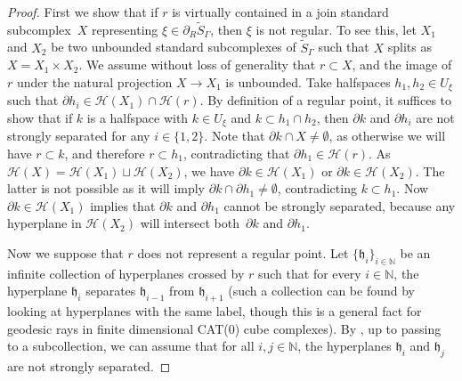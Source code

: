\documentclass[11pt]{article}
\numberwithin{equation}{section}
\let\mathcal\mathscr
\theoremstyle{plain}
\theoremstyle{definition}
\begin{document}
\begin{proof}
First we show that if $r$ is virtually contained in a join standard subcomplex~$X$ representing $\xi\in \partial_R \widetilde{S}_\Gamma$, then $\xi$ is not regular. To see this, let $X_1$ and $X_2$ be two unbounded standard subcomplexes of $\widetilde{S}_\Gamma$ such that $X$ splits as $X=X_1\times X_2$. We assume without loss of generality that $r\subset X$, and the image of $r$ under the natural projection $X\to X_1$ is unbounded. Take halfspaces $h_1,h_2\in U_\xi$ such that $\partial h_i\in \mathcal H(X_1)\cap\mathcal H(r)$. By definition of a regular point, it suffices to show that if $k$ is a halfspace with $k\in U_\xi$ and $k\subset h_1\cap h_2$, then $\partial k$ and $\partial h_i$ are not strongly separated for any $i\in\{1,2\}$. Note that $\partial k\cap X\neq \emptyset$, as otherwise we will have $r\subset k$, and therefore $r\subset h_1$, contradicting that $\partial h_1\in \mathcal H(r)$. As $\mathcal H(X)=\mathcal H(X_1)\sqcup\mathcal H(X_2)$, we have $\partial k\in \mathcal H(X_1)$ or $\partial k\in \mathcal H(X_2)$. The latter is not possible as it will imply $\partial k\cap\partial h_1\neq\emptyset$, contradicting $k\subset h_1$. Now $\partial k\in \mathcal H(X_1)$ implies that $\partial k$ and $\partial h_1$ cannot be strongly separated, because any hyperplane in $\mathcal H(X_2)$ will intersect both~$\partial k$ and $\partial h_1$.\enlargethispage{\baselineskip}%

Now we suppose that $r$ does not represent a regular point. Let $\{\mathfrak h_i\}_{i\in\mathbb{N}}$ be an infinite collection of hyperplanes crossed by $r$ such that for every $i\in\mathbb{N}$, the hyperplane $\mathfrak h_{i}$ separates $\mathfrak h_{i-1}$ from $\mathfrak h_{i+1}$ (such a collection can be found by looking at hyperplanes with the same label, though this is a general fact for geodesic rays in finite dimensional CAT(0) cube complexes). By \cite[Prop.\,7.5]{Fer}, up to passing to a subcollection, we can assume that for all $i,j\in\mathbb{N}$, the hyperplanes $\mathfrak h_i$ and $\mathfrak h_j$ are not strongly separated.


\end{proof}
\end{document}
